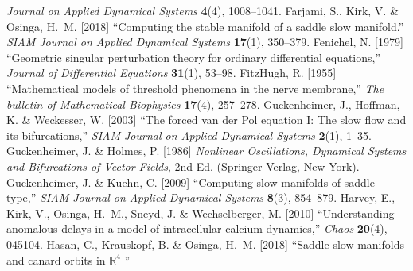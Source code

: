 \documentclass{ws-ijbc}
\begin{document}
\begin{thebibliography}{46}
\newblock \emph{Journal on Applied Dynamical Systems} \textbf{4}(4), 1008--1041.
%
Farjami, S., Kirk, V. \& Osinga, H.~M. [2018]
\newblock \enquote{{Computing the stable manifold of a saddle slow manifold}.}
\newblock \emph{SIAM Journal on Applied Dynamical Systems} \textbf{17}(1),  350--379.
%
Fenichel, N. [1979]
\newblock \enquote{Geometric singular perturbation theory for ordinary differential equations,}
\newblock \emph{Journal of Differential Equations} \textbf{31}(1),  53--98.
%
FitzHugh, R. [1955] \enquote{Mathematical models of threshold phenomena in the
nerve membrane,} \emph{The bulletin of Mathematical Biophysics} \textbf{17}(4), 257--278.
% 
%
Guckenheimer, J., Hoffman, K. \& Weckesser, W. [2003]
\newblock \enquote{The forced van der Pol equation I: The slow flow and its bifurcations,}
\newblock \emph{SIAM Journal on Applied Dynamical Systems} \textbf{2}(1), 1--35.
%
Guckenheimer, J. \& Holmes, P. [1986]
\newblock \emph{Nonlinear Oscillations, Dynamical Systems and Bifurcations of Vector Fields}, 2nd Ed.
\newblock (Springer-Verlag, New York).
%
Guckenheimer, J. \& Kuehn, C. [2009]
\newblock \enquote{Computing slow manifolds of saddle type,}
\newblock \emph{SIAM Journal on Applied Dynamical Systems} \textbf{8}(3), 854--879.
% 
% 
Harvey, E., Kirk, V., Osinga, H.~M., Sneyd, J. \& Wechselberger, M. [2010]
\newblock \enquote{Understanding anomalous delays in a model of intracellular calcium dynamics,}
\newblock \emph{Chaos} \textbf{20}(4), 045104.
% 
Hasan, C., Krauskopf, B. \& Osinga, H.~M. [2018]
\newblock \enquote{Saddle slow manifolds and canard orbits in {$\mathbb{R}^4$} 
}
\end{thebibliography}
\end{document}
